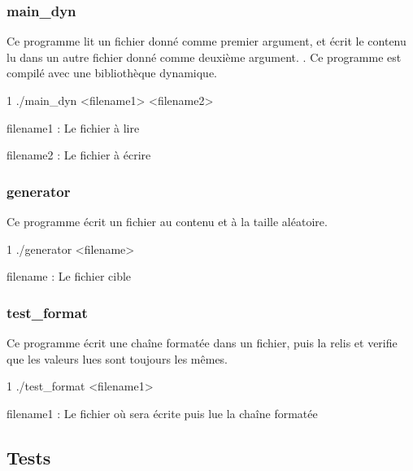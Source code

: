 \subsubsection*{main\+\_\+dyn}

Ce programme lit un fichier donné comme premier argument, et écrit le contenu lu dans un autre fichier donné comme deuxième argument. . Ce programme est compilé avec une bibliothèque dynamique.


\begin{DoxyCode}
1 ./main\_dyn <filename1> <filename2>
\end{DoxyCode}

\begin{DoxyItemize}
\item filename1 \+: Le fichier à lire
\item filename2 \+: Le fichier à écrire
\end{DoxyItemize}

\subsubsection*{generator}

Ce programme écrit un fichier au contenu et à la taille aléatoire.


\begin{DoxyCode}
1 ./generator <filename>
\end{DoxyCode}

\begin{DoxyItemize}
\item filename \+: Le fichier cible
\end{DoxyItemize}

\subsubsection*{test\+\_\+format}

Ce programme écrit une chaîne formatée dans un fichier, puis la relis et verifie que les valeurs lues sont toujours les mêmes.


\begin{DoxyCode}
1 ./test\_format <filename1>
\end{DoxyCode}

\begin{DoxyItemize}
\item filename1 \+: Le fichier où sera écrite puis lue la chaîne formatée
\end{DoxyItemize}

\subsection*{Tests}


